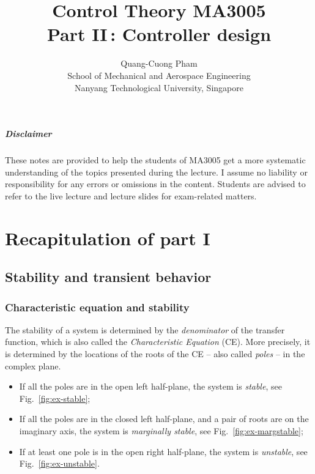\documentclass[a4paper,11pt]{report}
\title{Control Theory MA3005\\Part II\,: Controller design}
\author{Quang-Cuong Pham\\
  School of Mechanical and Aerospace Engineering\\ 
  Nanyang Technological University, Singapore}
\theoremstyle{definition}
\begin{document}
\maketitle

\paragraph{Disclaimer} These notes are provided to help the students of
MA3005 get a more systematic understanding of the topics presented
during the lecture. I assume no liability or responsibility for any
errors or omissions in the content. Students are advised to refer to
the live lecture and lecture slides for exam-related matters.

\tableofcontents

\setcounter{chapter}{-1}

\chapter{Recapitulation of part I}

\section{Stability and transient behavior}

\subsection{Characteristic equation and stability}

The stability of a system is determined by the \emph{denominator} of
the transfer function, which is also called the \emph{Characteristic
  Equation} (CE). More precisely, it is determined by the locations of
the roots of the CE -- also called \emph{poles} -- in the complex
plane.

\begin{itemize}
  \item If all the poles are in the open left half-plane,
    the system is \emph{stable}, see Fig.~\ref{fig:ex-stable};
  \item If all the poles are in the closed left half-plane, and a pair
    of roots are on the imaginary axis, the system is \emph{marginally
      stable}, see Fig.~\ref{fig:ex-margstable};
  \item If at least one pole is in the open right half-plane, the
    system is \emph{unstable}, see Fig.~\ref{fig:ex-unstable}.
\end{itemize}
\end{document}

